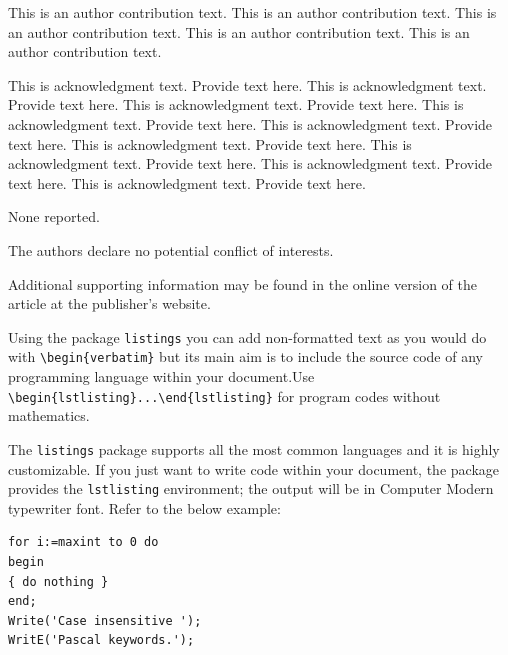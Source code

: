 \documentclass[AMA,Times1COL]{WileyNJDv5} %
\begin{document}
{}

This is an author contribution text. This is an author contribution text. This is an author contribution text. This is an author contribution text. This is an author contribution text.

This is acknowledgment text. \cite{Kenamond2013} Provide text here. This is acknowledgment text. Provide text here. This is acknowledgment text. Provide text here. This is acknowledgment text. Provide text here. This is acknowledgment text. Provide text here. This is acknowledgment text. Provide text here. This is acknowledgment text. Provide text here. This is acknowledgment text. Provide text here. This is acknowledgment text. Provide text here.



None reported.


The authors declare no potential conflict of interests.





Additional supporting information may be found in the
online version of the article at the publisher’s website.




\appendix

\vspace*{12pt}
Using the package {\tt listings} you can add non-formatted text as you would do with \verb|\begin{verbatim}| but its main aim is to include the source code of any programming language within your document.\newline Use \verb|\begin{lstlisting}...\end{lstlisting}| for program codes without mathematics.

The {\tt listings} package supports all the most common languages and it is highly customizable. If you just want to write code within your document, the package provides the {\tt lstlisting} environment; the output will be in Computer Modern typewriter font. Refer to the below example:


\begin{lstlisting}[caption={Descriptive caption text},label=DescriptiveLabel, basicstyle=\fontsize{8}{10}\selectfont\ttfamily]
for i:=maxint to 0 do
begin
{ do nothing }
end;
Write('Case insensitive ');
WritE('Pascal keywords.');
\end{lstlisting}
\end{document}

